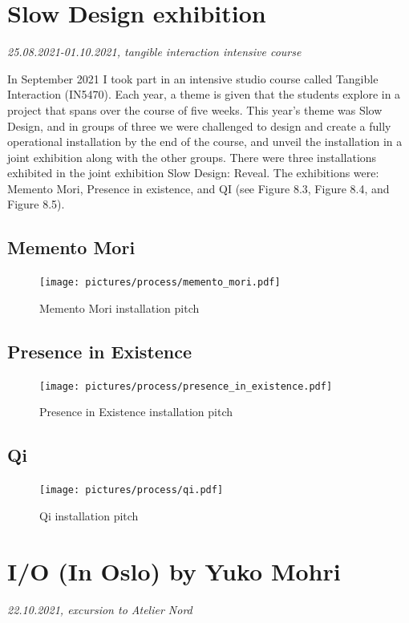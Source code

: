 \section{Slow Design exhibition}
\par
\emph{25.08.2021-01.10.2021, tangible interaction intensive course}
\par

In September 2021 I took part in an intensive studio course called Tangible Interaction (IN5470). Each year, a theme is given that the students explore in a project that spans over the course of five weeks. This year's theme was Slow Design, and in groups of three we were challenged to design and create a fully operational installation by the end of the course, and unveil the installation in a joint exhibition along with the other groups. There were three installations exhibited in the joint exhibition Slow Design: Reveal. The exhibitions were: Memento Mori, Presence in existence, and QI (see Figure 8.3, Figure 8.4, and Figure 8.5).

\subsection{Memento Mori}
\begin{figure}[H]
\texttt{[image: pictures/process/memento\_mori.pdf]}
\caption{Memento Mori installation pitch}
\centering 
\end{figure}

\subsection{Presence in Existence}
\begin{figure}[H]
\texttt{[image: pictures/process/presence\_in\_existence.pdf]}
\caption{Presence in Existence installation pitch}
\centering 
\end{figure}

\subsection{Qi}
\begin{figure}[H]
\texttt{[image: pictures/process/qi.pdf]}
\caption{Qi installation pitch}
\centering 
\end{figure}


\break
\section{I/O (In Oslo) by Yuko Mohri}
\par
\emph{22.10.2021, excursion to Atelier Nord}
\par

